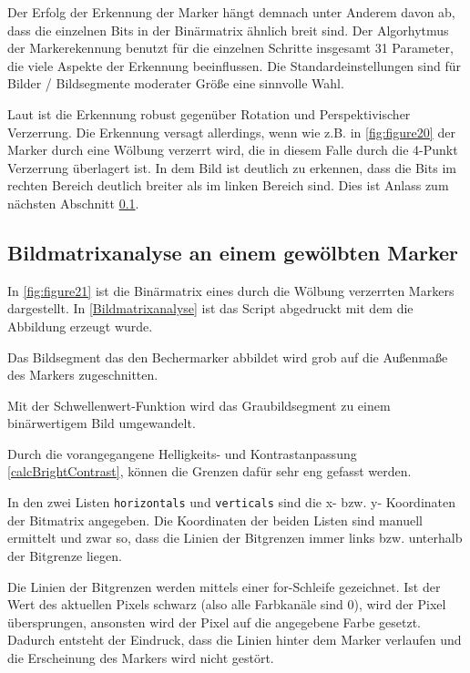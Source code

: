     Der Erfolg der Erkennung der Marker hängt demnach unter Anderem davon ab, dass die einzelnen Bits in der Binärmatrix ähnlich breit sind. 
    Der Algorhytmus der Markerekennung benutzt für die einzelnen Schritte insgesamt 31 Parameter, die viele Aspekte der Erkennung beeinflussen.
    Die Standardeinstellungen sind für Bilder / Bildsegmente moderater Größe eine sinnvolle Wahl. 
    
    Laut \cite[OpenCV]{OpenCVaruco} ist die Erkennung robust gegenüber Rotation und Perspektivischer Verzerrung. 
    Die Erkennung versagt allerdings, wenn wie z.B. in \ref{fig:figure20} der Marker durch eine Wölbung verzerrt wird, die in diesem Falle durch die 4-Punkt Verzerrung überlagert ist.
    In dem Bild ist deutlich zu erkennen, dass die Bits im rechten Bereich deutlich breiter als im linken Bereich sind. 
    Dies ist Anlass zum nächsten Abschnitt \ref{ChapBildmatrixanalyse}.

    \subsection{Bildmatrixanalyse an einem gewölbten Marker}\label{ChapBildmatrixanalyse}

    In \ref{fig:figure21} ist die Binärmatrix eines durch die Wölbung verzerrten Markers dargestellt. 
    In \ref{Bildmatrixanalyse} ist das Script abgedruckt mit dem die Abbildung erzeugt wurde.

    Das Bildsegment das den Bechermarker abbildet wird grob auf die Außenmaße des Markers zugeschnitten.

    Mit der Schwellenwert-Funktion wird das Graubildsegment zu einem binärwertigem Bild umgewandelt.

    Durch die vorangegangene Helligkeits- und Kontrastanpassung \ref{calcBrightContrast}, können die Grenzen dafür sehr eng gefasst werden.
    
    In den zwei Listen \verb|horizontals| und \verb|verticals| sind die x- bzw. y- Koordinaten der Bitmatrix angegeben. 
    Die Koordinaten der beiden Listen sind manuell ermittelt und zwar so, dass die Linien der Bitgrenzen immer links bzw. unterhalb der Bitgrenze liegen.

    Die Linien der Bitgrenzen werden mittels einer for-Schleife gezeichnet. 
    Ist der Wert des aktuellen Pixels schwarz (also alle Farbkanäle sind 0), wird der Pixel übersprungen, ansonsten wird der Pixel auf die angegebene Farbe gesetzt. 
    Dadurch entsteht der Eindruck, dass die Linien hinter dem Marker verlaufen und die Erscheinung des Markers wird nicht gestört. 
    
